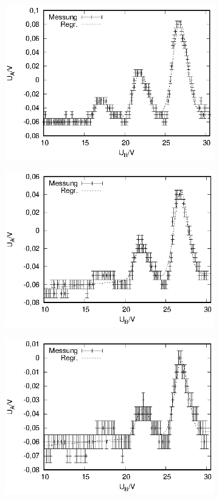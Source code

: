 \begin{figure}[h!]
  \centering
  \begin{subfigure}[h]{0.5\textwidth}
    \centering
    \includegraphics{data/fh/168K4V.eps}
  \end{subfigure}%
  \begin{subfigure}[h]{0.5\textwidth}
    \centering
    \includegraphics{data/fh/173K4V.eps}
  \end{subfigure}
    \begin{subfigure}[h]{0.5\textwidth}
    \centering
    \includegraphics{data/fh/175K4V.eps}

\end{subfigure}
\end{figure}
